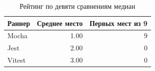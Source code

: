 \begin{table}[H]\centering\caption{Рейтинг по девяти сравнениям медиан}
\begin{tabular}{lrr}\toprule Раннер & Среднее место & Первых мест из 9\\\midrule
Mocha & 1.00 & 9\\
Jest & 2.00 & 0\\
Vitest & 3.00 & 0\\
\bottomrule\end{tabular}\end{table}
